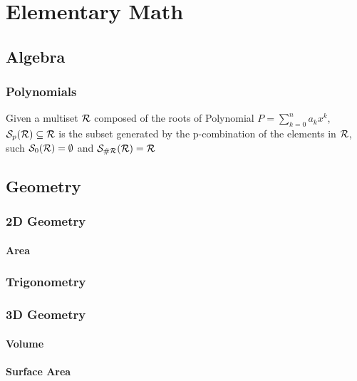 \documentclass[../mathematics_cheat_sheet.tex]{subfiles}
\begin{document}
\part{Elementary Math}





\chapter{Algebra}
\section{Polynomials}
Given a multiset $\mathcal{R}$ composed of the roots of Polynomial ${P=\sum_{k=0}^{n}a_{k}x^{k}}$, $\mathcal{S}_{p}(\mathcal{R})\subseteq\mathcal{R}$ is the subset generated by the p-combination of the elements in $\mathcal{R}$, such
$\mathcal{S}_{0}(\mathcal{R})=\emptyset$ and $\mathcal{S}_{\#{\mathcal{R}}}(\mathcal{R})=\mathcal{R}$


\chapter{Geometry}
\section{2D Geometry}
\subsection{Area}
\section{Trigonometry}
\section{3D Geometry}
\subsection{Volume}
\subsection{Surface Area}
\end{document}
